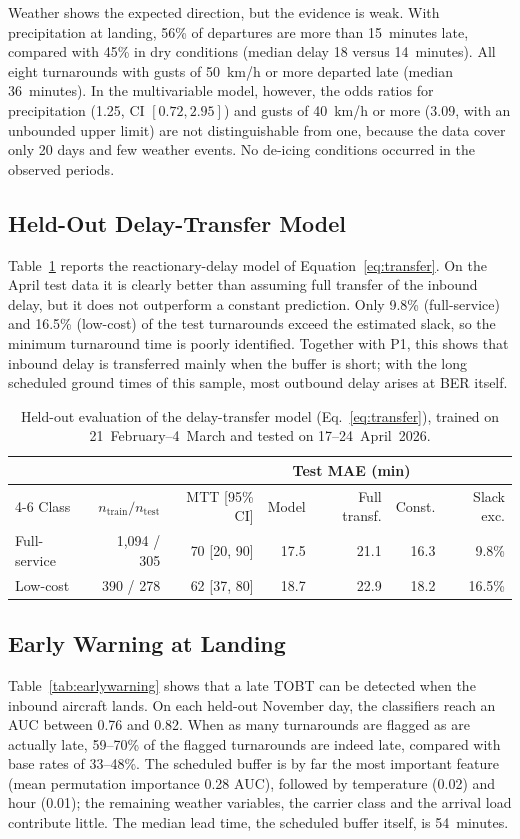 Weather shows the expected direction, but the evidence is weak. With precipitation at landing, 56\% of departures are more than 15~minutes late, compared with 45\% in dry conditions (median delay 18 versus 14~minutes). All eight turnarounds with gusts of 50~km/h or more departed late (median 36~minutes). In the multivariable model, however, the odds ratios for precipitation (1.25, CI $[0.72,2.95]$) and gusts of 40~km/h or more (3.09, with an unbounded upper limit) are not distinguishable from one, because the data cover only 20 days and few weather events. No de-icing conditions occurred in the observed periods.

\subsection{Held-Out Delay-Transfer Model}
Table~\ref{tab:heldout} reports the reactionary-delay model of Equation~\ref{eq:transfer}. On the April test data it is clearly better than assuming full transfer of the inbound delay, but it does not outperform a constant prediction. Only 9.8\% (full-service) and 16.5\% (low-cost) of the test turnarounds exceed the estimated slack, so the minimum turnaround time is poorly identified. Together with P1, this shows that inbound delay is transferred mainly when the buffer is short; with the long scheduled ground times of this sample, most outbound delay arises at BER itself.

\begin{table}[htbp]\centering\footnotesize
\begin{tabular}{lrrrrrr}\hline
& & & \multicolumn{3}{c}{Test MAE (min)} & \\\cline{4-6}
Class & $n_{\mathrm{train}}/n_{\mathrm{test}}$ & MTT [95\% CI] & Model & Full transf. & Const. & Slack exc.\\\hline
Full-service & 1,094 / 305 & 70 [20, 90] & 17.5 & 21.1 & 16.3 & 9.8\%\\
Low-cost & 390 / 278 & 62 [37, 80] & 18.7 & 22.9 & 18.2 & 16.5\%\\\hline
\end{tabular}
\caption{Held-out evaluation of the delay-transfer model (Eq.~\ref{eq:transfer}), trained on 21~February--4~March and tested on 17--24~April~2026.}
\label{tab:heldout}
\end{table}

\subsection{Early Warning at Landing}
Table~\ref{tab:earlywarning} shows that a late TOBT can be detected when the inbound aircraft lands. On each held-out November day, the classifiers reach an AUC between 0.76 and 0.82. When as many turnarounds are flagged as are actually late, 59--70\% of the flagged turnarounds are indeed late, compared with base rates of 33--48\%. The scheduled buffer is by far the most important feature (mean permutation importance 0.28 AUC), followed by temperature (0.02) and hour (0.01); the remaining weather variables, the carrier class and the arrival load contribute little. The median lead time, the scheduled buffer itself, is 54~minutes.

